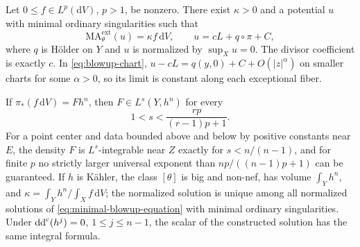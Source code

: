 \begin{theorem}\label{thm:minimal-blowup-data}
Let $0\leq f\in L^p(\mathrm{d}V)$, $p>1$, be nonzero. There exist $\kappa>0$ and a potential $u$ with minimal ordinary singularities such that
\begin{equation}\label{eq:minimal-blowup-equation}
 \mathrm{MA}^{\mathrm{ext}}_\theta(u)=\kappa f\,\mathrm{d}V,
 \qquad u=cL+q\circ\pi+C,
\end{equation}
where $q$ is H\"older on $Y$ and $u$ is normalized by $\sup_Xu=0$. The divisor coefficient is exactly $c$. In \eqref{eq:blowup-chart}, $u-cL=q(y,0)+C+O(|z|^\alpha)$ on smaller charts for some $\alpha>0$, so its limit is constant along each exceptional fiber.

If $\pi_*(f\,\mathrm{d}V)=Fh^n$, then $F\in L^s(Y,h^n)$ for every
\begin{equation}\label{eq:pushforward-exponent}
 1<s<\frac{rp}{(r-1)p+1}.
\end{equation}
For a point center and data bounded above and below by positive constants near $E$, the density $F$ is $L^s$-integrable near $Z$ exactly for $s<n/(n-1)$, and for finite $p$ no strictly larger universal exponent than $np/((n-1)p+1)$ can be guaranteed. If $h$ is K\"ahler, the class $[\theta]$ is big and non-nef, has volume $\int_Yh^n$, and $\kappa=\int_Yh^n/\int_Xf\,\mathrm{d}V$; the normalized solution is unique among all normalized solutions of \eqref{eq:minimal-blowup-equation} with minimal ordinary singularities. Under $\mathrm{dd}^{\mathrm{c}}(h^j)=0$, $1\leq j\leq n-1$, the scalar of the constructed solution has the same integral formula.
\end{theorem}

